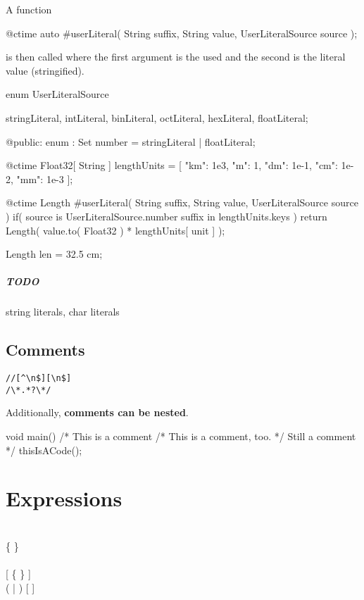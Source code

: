 A function
\begin{code}
@ctime auto #userLiteral( String suffix, String value, UserLiteralSource source );
\end{code}
is then called where the first argument is the  used and the second is the literal value (stringified).

\begin{code}
enum UserLiteralSource {
	stringLiteral,
	intLiteral,
	binLiteral,
	octLiteral,
	hexLiteral,
	floatLiteral;
	
@public:
	enum : Set {
		number = stringLiteral | floatLiteral;	
	}
}
\end{code}

\begin{code}
@ctime Float32[ String ] lengthUnits = [
	"km": 1e3, "m": 1, "dm": 1e-1, "cm": 1e-2, "mm": 1e-3
];
	
@ctime Length #userLiteral( String suffix, String value, UserLiteralSource source )
	if( source is UserLiteralSource.number suffix in lengthUnits.keys )
{
	return Length( value.to( Float32 ) * lengthUnits[ unit ] );
}

Length len = 32.5 cm;
\end{code}

\paragraph{TODO} string literals, char literals

\section{Comments}
\begin{grammar}
	 \verb|//[^\n$][\n$]| \\
	 \verb|/\*.*?\*/|
\end{grammar}
Additionally, \textbf{comments can be nested}.

\begin{code}
void main() {
	/* This is a comment
		/* This is a comment, too. */
		Still a comment */
	thisIsACode();
}
\end{code}

\chapter{Expressions}
\begin{grammar}
	  \\
	  \{ \kwd{,}  \} \\
	
	\\
	
	 \kwd{(} [  \{ \kwd{,}  \} ] \kwd{)} \\
	 (  |  ) [  ] \\
	
\end{grammar}

